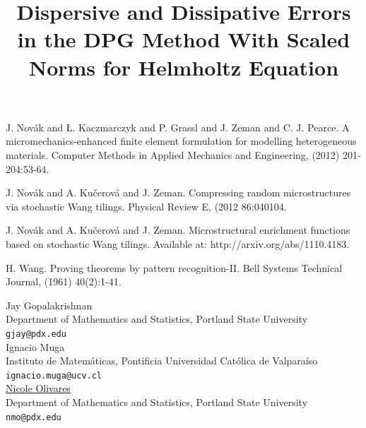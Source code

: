 \documentclass[article, A4, 11pt]{llncs}%
\begin{document}

\begin{thebibliography}{10}
{\sc J. Nov\'{a}k and \L. Kaczmarczyk and P. Grassl and J. Zeman and C. J. Pearce}. {A micromechanics-enhanced finite element formulation for modelling heterogeneous materials}. Computer Methods in Applied Mechanics and Engineering, (2012) 201-204:53-64.

{\sc J. Nov\'{a}k and A. Ku\v{c}erov\'{a} and J. Zeman}. {Compressing random microstructures via stochastic Wang tilings}. Physical Review E, (2012 86:040104.

{\sc J. Nov\'{a}k and A. Ku\v{c}erov\'{a} and J. Zeman}. {Microstructural enrichment functions based on stochastic Wang tilings}. Available at: http://arxiv.org/abs/1110.4183.

{\sc H. Wang}. {Proving theorems by pattern recognition-II}. Bell Systems Technical Journal, (1961) 40(2):1-41.
\end{thebibliography} %

\title{Dispersive and Dissipative Errors in the DPG Method With Scaled Norms for Helmholtz Equation}
 \author{} \institute{}
\maketitle
\begin{center}
{\large Jay Gopalakrishnan}\\
Department of Mathematics and Statistics, Portland State University\\
{\tt gjay@pdx.edu}
\\ \vspace{4mm}
{\large Ignacio Muga}\\
Instituto de Matemáticas, Pontificia Universidad Católica de Valparaíso\\
{\tt ignacio.muga@ucv.cl}
\\ \vspace{4mm}
{\large \underline{Nicole Olivares}}\\
Department of Mathematics and Statistics, Portland State University\\
{\tt nmo@pdx.edu}
\end{center}
\end{document}
